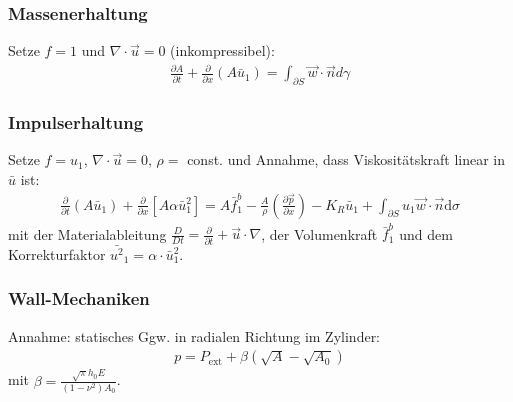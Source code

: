 \begin{frame}\frametitle{Massenerhaltung}
Setze $f=1$ und $\nabla \cdot \vec u = 0$ (inkompressibel):
\begin{align}
  \frac{\partial A}{\partial t} + \frac{\partial}{\partial x} (A \bar u_1) = \int_{\partial S} \vec w \cdot \vec n d\gamma %
\end{align}
\end{frame}

\begin{frame}\frametitle{Impulserhaltung}
  Setze $f=u_1$, $\nabla \cdot \vec u = 0$, $\rho=$ const. und Annahme, dass Viskositätskraft linear in $\bar{u}$ ist:
\begin{align}
\boxed{
\frac{\partial}{\partial t} (A \bar u_1) + \frac{\partial}{\partial x} \left[ A \alpha \bar{u}_1^2 \right] = A \bar{f}^b_1 - \frac{A}{\rho}\left(\frac{\partial \vec{p}}{\partial x}\right)- K_R \bar{u}_1 + \int_{\partial S}u_1 \vec{w}\cdot \vec{n}\text{d}\sigma}
\end{align}
  mit der Materialableitung $\frac{D}{Dt}=\frac{\partial}{\partial t}+\vec{u}\cdot \nabla$, der Volumenkraft $\bar{f}^b_1$ und dem Korrekturfaktor $\bar{u^2}_1=\alpha \cdot \bar{u}_1^2$. %
  \end{frame}
\begin{frame}
\frametitle{Wall-Mechaniken}
Annahme: statisches Ggw. in radialen Richtung im Zylinder:
\begin{align}
p=P_\text{ext}+\beta(\sqrt{A}-\sqrt{A_0})
\end{align}
mit $\beta = \frac{\sqrt{\pi}h_0E}{(1-\nu^2)A_0}$.
\end{frame}



